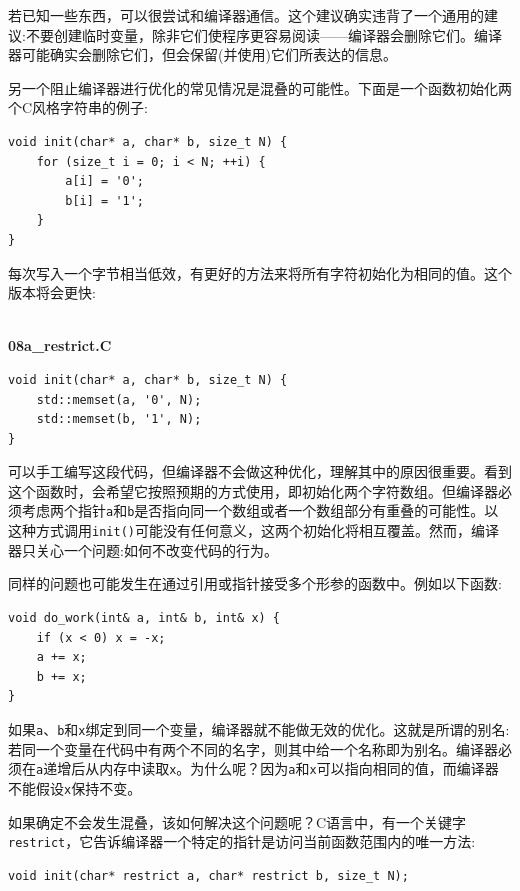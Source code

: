 若已知一些东西，可以很尝试和编译器通信。这个建议确实违背了一个通用的建议:不要创建临时变量，除非它们使程序更容易阅读——编译器会删除它们。编译器可能确实会删除它们，但会保留(并使用)它们所表达的信息。

另一个阻止编译器进行优化的常见情况是混叠的可能性。下面是一个函数初始化两个C风格字符串的例子:

\begin{lstlisting}[style=styleCXX]
void init(char* a, char* b, size_t N) {
	for (size_t i = 0; i < N; ++i) {
		a[i] = '0';
		b[i] = '1';
	}
}

\end{lstlisting}

每次写入一个字节相当低效，有更好的方法来将所有字符初始化为相同的值。这个版本将会更快:

\hspace*{\fill} \\ %
\noindent
\textbf{08a\_restrict.C}
\begin{lstlisting}[style=styleCXX]
void init(char* a, char* b, size_t N) {
	std::memset(a, '0', N);
	std::memset(b, '1', N);
}
\end{lstlisting}

可以手工编写这段代码，但编译器不会做这种优化，理解其中的原因很重要。看到这个函数时，会希望它按照预期的方式使用，即初始化两个字符数组。但编译器必须考虑两个指针\texttt{a}和\texttt{b}是否指向同一个数组或者一个数组部分有重叠的可能性。以这种方式调用\texttt{init()}可能没有任何意义，这两个初始化将相互覆盖。然而，编译器只关心一个问题:如何不改变代码的行为。 

同样的问题也可能发生在通过引用或指针接受多个形参的函数中。例如以下函数:

\begin{lstlisting}[style=styleCXX]
void do_work(int& a, int& b, int& x) {
	if (x < 0) x = -x;
	a += x;
	b += x;
}
\end{lstlisting}

如果\texttt{a}、\texttt{b}和\texttt{x}绑定到同一个变量，编译器就不能做无效的优化。这就是所谓的别名:若同一个变量在代码中有两个不同的名字，则其中给一个名称即为别名。编译器必须在\texttt{a}递增后从内存中读取\texttt{x}。为什么呢？因为\texttt{a}和\texttt{x}可以指向相同的值，而编译器不能假设\texttt{x}保持不变。

如果确定不会发生混叠，该如何解决这个问题呢？C语言中，有一个关键字\texttt{restrict}，它告诉编译器一个特定的指针是访问当前函数范围内的唯一方法:

\begin{lstlisting}[style=styleCXX]
void init(char* restrict a, char* restrict b, size_t N);
\end{lstlisting}

